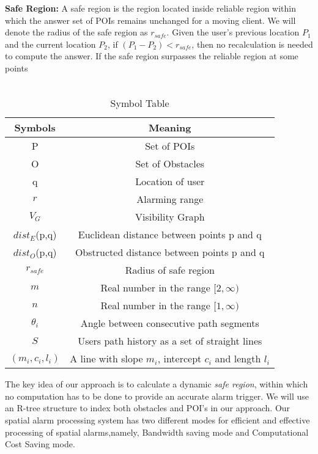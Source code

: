 \textbf{Safe Region:} A safe region is the region located inside reliable region within which the answer set of POIs remains unchanged for a moving client. We will denote the radius of the safe region as $r_{safe}$. Given the user's previous location $P_1$ and the current location $P_2$, if $(P_1 - P_2) < r_{safe}$, then no recalculation is needed to compute the answer. If the safe region surpasses the reliable region at some points 
\\ \\

\begin{table}[h]
\centering 

\caption{Symbol Table}
\begin{tabular}{|c|c|} \hline
Symbols&Meaning \\ \hline
P & Set of POIs\\ \hline
O & Set of Obstacles\\ \hline
q & Location of user\\ \hline
$r$ & Alarming range\\ \hline
$V_{G}$       & Visibility Graph\\ \hline
$dist_E$(p,q) & Euclidean distance between points p and q\\ \hline
$dist_O$(p,q) & Obstructed distance between points p and q\\ \hline
$r_{safe}$    & Radius of safe region\\ \hline
$m$           & Real number in the range $[2,\infty)$ \\ \hline
$n$           & Real number in the range $[1,\infty) $  \\ \hline
$\theta_i $   & Angle between consecutive path segments \\ \hline 
$ S $         & Users path history as a set of straight lines \\ \hline
$(m_i,c_i,l_i)$ & A line with slope $m_i$, intercept $c_i$ and length $l_i$ \\ \hline

\end{tabular}
\end{table}
\vspace*{12pt}

The key idea of our approach is to calculate a dynamic \textit{safe region}, within which no computation has to be done to provide an accurate alarm trigger. We will use an R-tree structure to index both obstacles and POI's in our approach. Our spatial alarm processing system has two different modes for efficient and effective processing of spatial alarms,namely, Bandwidth saving mode and Computational Cost Saving mode.\\

